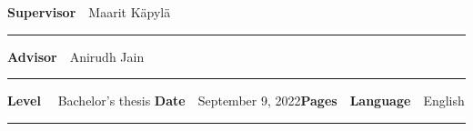 \begin{spacing}{.88}
{	{\fontsize{10.5pt}{10.5pt}\bfseries\sffamily\lsstyle Supervisor}~~{\small Maarit Käpylä}

	\vspace{-2.4mm}\rule{\textwidth}{.75pt}

	{\fontsize{10.5pt}{10.5pt}\bfseries\sffamily\lsstyle Advisor}~~{\small Anirudh Jain}

	\vspace{-2.4mm}\rule{\textwidth}{.75pt}

	{\fontsize{10.5pt}{10.5pt}\bfseries\sffamily\lsstyle Level}~~{\small
  Bachelor's thesis}\hfill{\fontsize{10.5pt}{10.5pt}\bfseries\sffamily\lsstyle
  Date}~~{\small September 9, 2022}\hfill{\fontsize{10.5pt}{10.5pt}\bfseries\sffamily\lsstyle Pages}~~{\small \pageref{LastPage}}\hfill{\fontsize{10.5pt}{10.5pt}\bfseries\sffamily\lsstyle Language}~~{\small English}

	\vspace{-2.4mm}\rule{\textwidth}{.75pt}

	\vspace{6mm}

	} %
\end{spacing}
